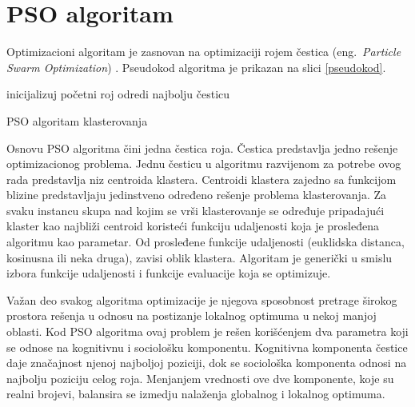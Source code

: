 \documentclass[a4paper,serbian]{symopissr}
\begin{document}
\section{PSO algoritam}
\label{sec:algoritam}
Optimizacioni algoritam je zasnovan na optimizaciji rojem čestica (eng.~{\em Particle Swarm Optimization}) \cite{pso}.
Pseudokod algoritma je prikazan na slici \ref{pseudokod}.
\begin{algorithm}
\SetAlgoLined
{}
 inicijalizuj početni roj\;
 odredi najbolju česticu\;
 
 \caption{PSO algoritam klasterovanja}
 \label{pseudokod}
\end{algorithm}
Osnovu PSO algoritma čini jedna čestica roja. Čestica predstavlja jedno rešenje optimizacionog problema.
Jednu česticu u algoritmu razvijenom za potrebe ovog rada predstavlja niz centroida klastera.
Centroidi klastera zajedno sa funkcijom blizine predstavljaju jedinstveno određeno rešenje problema klasterovanja. Za svaku instancu skupa nad kojim se vrši klasterovanje se određuje pripadajući klaster kao najbliži centroid koristeći funkciju udaljenosti koja je prosleđena algoritmu kao parametar.
Od prosleđene funkcije udaljenosti (euklidska distanca, kosinusna ili neka druga), zavisi oblik klastera.
Algoritam je generički u smislu izbora funkcije udaljenosti i funkcije evaluacije koja se optimizuje.

Važan deo svakog algoritma optimizacije je njegova sposobnost pretrage širokog prostora rešenja u odnosu na postizanje lokalnog optimuma u nekoj manjoj oblasti. Kod PSO algoritma ovaj problem je rešen korišćenjem dva parametra koji se odnose na kognitivnu i sociološku komponentu.
Kognitivna komponenta čestice daje značajnost njenoj najboljoj poziciji, dok se sociološka komponenta odnosi na najbolju poziciju celog roja.
Menjanjem vrednosti ove dve komponente, koje su realni brojevi, balansira se izmedju nalaženja globalnog i lokalnog optimuma.\\
\end{document}
